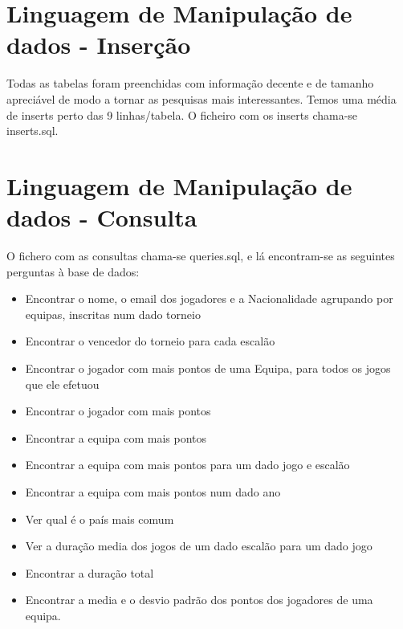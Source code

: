 \documentclass[a4paper]{article}
\begin{document}
\section{Linguagem de Manipulação de dados - Inserção}
Todas as tabelas foram preenchidas com informação decente e de tamanho apreciável de modo a tornar as pesquisas mais interessantes. Temos uma média de inserts perto das 9 linhas/tabela. O ficheiro com os inserts chama-se inserts.sql.

\section{Linguagem de Manipulação de dados - Consulta}
O fichero com as consultas chama-se queries.sql, e lá encontram-se as seguintes perguntas à base de dados:
\begin{itemize}
  \item Encontrar o nome, o email dos jogadores e a Nacionalidade agrupando por equipas, inscritas num dado torneio
  \item Encontrar o vencedor do torneio para cada escalão
  \item Encontrar o jogador com mais pontos de uma Equipa, para todos os jogos que ele efetuou
  \item Encontrar o jogador com mais pontos
  \item Encontrar a equipa com mais pontos
  \item Encontrar a equipa com mais pontos para um dado jogo e escalão
  \item Encontrar a equipa com mais pontos num dado ano
  \item Ver qual é o país mais comum
  \item Ver a duração media dos jogos de um dado escalão para um dado jogo
  \item Encontrar a duração total
  \item Encontrar a media e o desvio padrão dos pontos dos jogadores de uma equipa.
\end{itemize}

\end{document}
